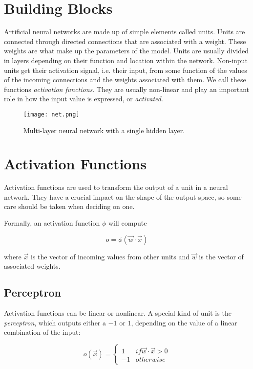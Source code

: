 \section{Building Blocks}
Artificial neural networks are made up of simple elements called units.
Units are connected through directed connections
that are associated with a weight.
These weights are what make up the parameters of the model.
Units are usually divided in layers depending on their function
and location within the network.
Non-input units get their activation signal, i.e. their input,
from some function of the values of the incoming connections
and the weights associated with them.
We call these functions \textit{activation functions}.
They are usually non-linear and play an important role
in how the input value is expressed, or \textit{activated}.

\begin{figure}[h]
\label{fig.neuralnet}
\center
\texttt{[image: net.png]}
\caption{Multi-layer neural network with a single hidden layer.}
\end{figure}

\section{Activation Functions}
\label{sec:activation}

Activation functions are used to transform the output
of a unit in a neural network.
They have a crucial impact on the shape of the output space,
so some care should be taken when deciding on one.

Formally, an activation function $\phi$ will compute

\begin{equation}
  o = \phi (\overrightarrow{w} \cdot \overrightarrow{x})
\end{equation}

where $\overrightarrow{x}$
is the vector of incoming values from other units
and $\overrightarrow{w}$
is the vector of associated weights.

\subsection{Perceptron}
Activation functions can be linear or nonlinear.
A special kind of unit is the \textit{perceptron},
which outputs either a $-1$ or $1$,
depending on the value of a linear combination of the input:

\begin{equation}
\label{eq.perceptron}
o(\overrightarrow{x}) = \begin{cases}
1 & if \overrightarrow{w}\cdot\overrightarrow{x} > 0 \\
-1 & otherwise
\end{cases}
\end{equation}

